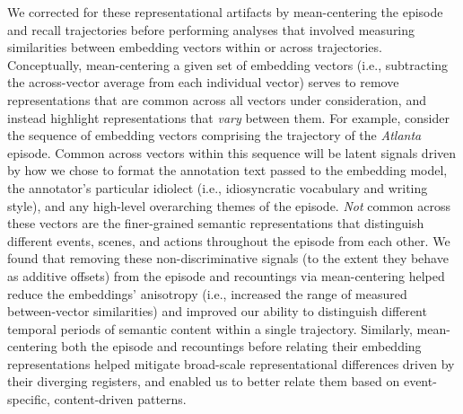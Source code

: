 \documentclass[10pt]{article}
\begin{document}
We corrected for these representational artifacts by mean-centering the episode and recall trajectories before performing analyses that involved measuring similarities between embedding vectors within or across trajectories.
Conceptually, mean-centering a given set of embedding vectors (i.e., subtracting the across-vector average from each individual vector) serves to remove representations that are common across all vectors under consideration, and instead highlight representations that \textit{vary} between them.
For example, consider the sequence of embedding vectors comprising the trajectory of the \textit{Atlanta} episode.
Common across vectors within this sequence will be latent signals driven by how we chose to format the annotation text passed to the embedding model, the annotator's particular idiolect (i.e., idiosyncratic vocabulary and writing style), and any high-level overarching themes of the episode.
\textit{Not} common across these vectors are the finer-grained semantic representations that distinguish different events, scenes, and actions throughout the episode from each other.
We found that removing these non-discriminative signals (to the extent they behave as additive offsets) from the episode and recountings via mean-centering helped reduce the embeddings' anisotropy (i.e., increased the range of measured between-vector similarities) and improved our ability to distinguish different temporal periods of semantic content within a single trajectory.
Similarly, mean-centering both the episode and recountings before relating their embedding representations helped mitigate broad-scale representational differences driven by their diverging registers, and enabled us to better relate them based on event-specific, content-driven patterns.
\end{document}

